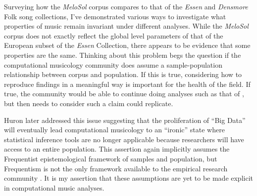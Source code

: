 \documentclass[12pt,]{book}
\begin{document}
Surveying how the \emph{MeloSol} corpus compares to that of the \emph{Essen} and \emph{Densmore} Folk song collections, I've demonstrated various ways to investigate what properties of music remain invariant under different analyses.
While the \emph{MeloSol} corpus does not exactly reflect the global level parameters of that of the European subset of the \emph{Essen} Collection, there appears to be evidence that some properties are the same.
Thinking about this problem begs the question if the computational musicology community does assume a sample-population relationship between corpus and population.
If this is true, considering how to reproduce findings in a meaningful way is important for the health of the field.
If true, the community would be able to continue doing analyses such as that of \citet{huronMelodicArchWestern1996}, but then needs to consider such a claim could replicate.

Huron later addressed this issue \citep{huronVirtuousVexatiousAge2013} suggesting that the proliferation of ``Big Data'' will eventually lead computational musicology to an ``ironic'' state where statistical inference tools are no longer applicable because researchers will have access to an entire population.
This assertion again implicitly assumes the Frequentist epistemological framework of samples and population, but Frequentism is not the only framework available to the empirical research community \citep{dienesUnderstandingPsychologyScience2008}.
It is my assertion that these assumptions are yet to be made explicit in computational music analyses.
\end{document}
